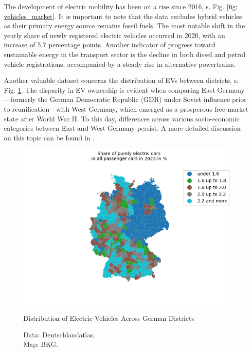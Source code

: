 The development of electric mobility has been on a rise since 2016, s. Fig. \ref{fig: vehicles_market}. It is important to note that the data excludes hybrid vehicles as their primary energy source remains fossil fuels. The most notable shift in the yearly share of newly registered electric vehicles occurred in 2020, with an increase of 5.7 percentage points. Another indicator of progress toward sustainable energy in the transport sector is the decline in both diesel and petrol vehicle registrations, accompanied by a steady rise in alternative powertrains. 

Another valuable dataset concerns the distribution of EVs between districts, s. Fig. \ref{fig: districts}. The disparity in EV ownership is evident when comparing East Germany—formerly the German Democratic Republic (GDR) under Soviet influence prior to reunification—with West Germany, which emerged as a prosperous free-market state after World War II. To this day, differences across various socio-economic categories between East and West Germany persist. A more detailed discussion on this topic can be found in \cite{BundestagOstWest}.
\begin{figure}[H]
	\begin{center}
		\includegraphics[width=\linewidth]{images/EV_percentage.png}
		\caption{Distribution of Electric Vehicles Across German Districts}
		\label{fig: districts}
  		\caption*{Data: Deutschlandatlas, \cite{DeAtlasEVXLSX} \\
  				Map: BKG, \cite{BKG} } 
  	\end{center}
\end{figure}
